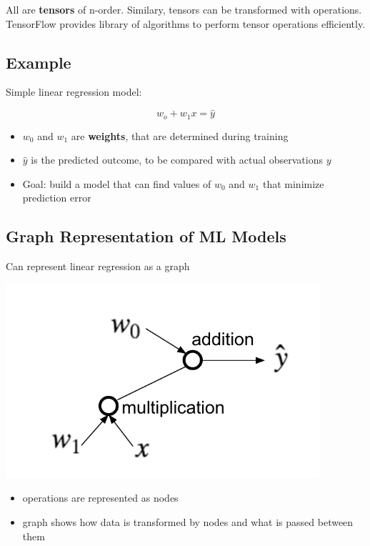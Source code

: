\documentclass[11pt]{article}
\begin{document}
All are \textbf{tensors} of n-order. Similary, tensors can be transformed with
operations. TensorFlow provides library of algorithms to perform tensor operations efficiently. 
\subsection*{Example}
\label{sec:org1812353}
Simple linear regression model:

$$w_o + w_1 x = \hat{y}$$

\begin{itemize}
\item \(w_0\) and \(w_1\) are \textbf{weights}, that are determined during training
\item \(\hat{y}\) is the predicted outcome, to be compared with actual observations \(y\)
\item Goal: build a model that can find values of \(w_0\) and \(w_1\) that minimize prediction error
\end{itemize}
\subsection*{Graph Representation of ML Models}
\label{sec:orgc986e7a}

Can represent linear regression as a graph

\begin{center}
\includegraphics[width=.9\linewidth]{images/linear_reg_graph.png}
\end{center}

\begin{itemize}
\item operations are represented as nodes
\item graph shows how data is transformed by nodes and what is passed between them
\end{itemize}
\end{document}
